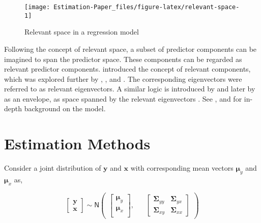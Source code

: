 \documentclass[12pt,3p,authoryear]{elsarticle}
\begin{document}
\begin{figure}

{\centering \texttt{[image: Estimation-Paper\_files/figure-latex/relevant-space-1]} 

}

\caption{Relevant space in a regression model}\label{fig:relevant-space}
\end{figure}

Following the concept of relevant space, a subset of predictor
components can be imagined to span the predictor space. These components
can be regarded as relevant predictor components. \citet{Naes1985}
introduced the concept of relevant components, which was explored
further by \citet{helland1990partial}, \citet{naes1993relevant},
\citet{Helland1994b} and \citet{Helland2000}. The corresponding
eigenvectors were referred to as relevant eigenvectors. A similar logic
is introduced by \citet{cook2010envelope} and later by
\citet{cook2013envelopes} as an envelope, as space spanned by the
relevant eigenvectors \citep[p.101]{cook2018envelope}. See
\citet{Rimal2018}, \citet{saebo2015simrel} and \citet{rimal2019pred} for
in-depth background on the model.

\hypertarget{estimation-methods}{\section{Estimation
Methods}\label{estimation-methods}}

Consider a joint distribution of \(\mathbf{y}\) and \(\mathbf{x}\) with
corresponding mean vectors \(\boldsymbol{\mu}_y\) and
\(\boldsymbol{\mu}_x\) as,

\begin{equation}
  \begin{bmatrix}
    \mathbf{y} \\ \mathbf{x}
  \end{bmatrix} 
  \sim \mathsf{N}
  \begin{pmatrix}
    \begin{bmatrix}
      \boldsymbol{\mu}_y \\
      \boldsymbol{\mu}_x \\
    \end{bmatrix}, &&
    \begin{bmatrix}
      \boldsymbol{\Sigma}_{yy} & \boldsymbol{\Sigma}_{yx} \\
      \boldsymbol{\Sigma}_{xy} & \boldsymbol{\Sigma}_{xx} 
    \end{bmatrix}
  \end{pmatrix}
  \label{eq:model-1}
\end{equation}
\end{document}
